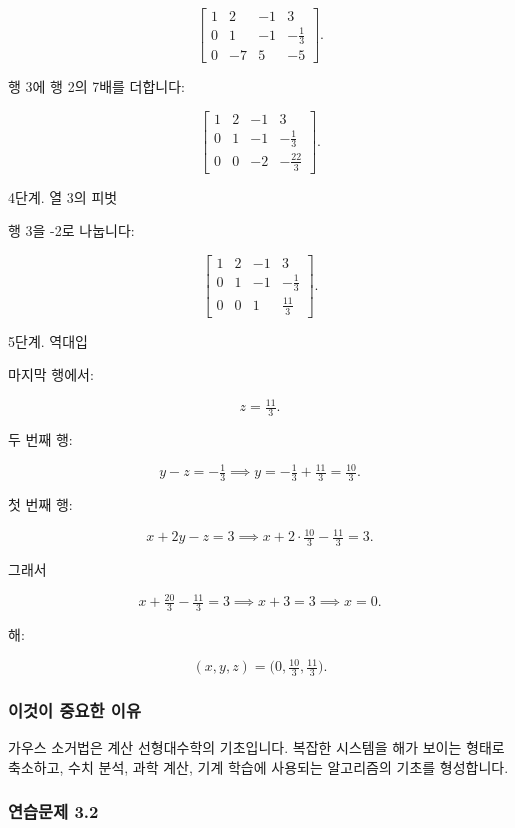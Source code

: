 \documentclass[
  12pt,
  a4paper,
]{article}
\begin{document}
\[\left[\begin{array}{ccc|c}
1 & 2 & -1 & 3 \\
0 & 1 & -1 & -\tfrac{1}{3} \\
0 & -7 & 5 & -5
\end{array}\right].\]

행 3에 행 2의 7배를 더합니다:

\[\left[\begin{array}{ccc|c}
1 & 2 & -1 & 3 \\
0 & 1 & -1 & -\tfrac{1}{3} \\
0 & 0 & -2 & -\tfrac{22}{3}
\end{array}\right].\]

4단계. 열 3의 피벗

행 3을 -2로 나눕니다:

\[\left[\begin{array}{ccc|c}
1 & 2 & -1 & 3 \\
0 & 1 & -1 & -\tfrac{1}{3} \\
0 & 0 & 1 & \tfrac{11}{3}
\end{array}\right].\]

5단계. 역대입

마지막 행에서:

\[z = \tfrac{11}{3}.\]

두 번째 행:

\[y - z = -\tfrac{1}{3} \implies y = -\tfrac{1}{3} + \tfrac{11}{3} = \tfrac{10}{3}.\]

첫 번째 행:

\[x + 2y - z = 3 \implies x + 2\cdot\tfrac{10}{3} - \tfrac{11}{3} = 3.\]

그래서

\[x + \tfrac{20}{3} - \tfrac{11}{3} = 3 \implies x + 3 = 3 \implies x = 0.\]

해:

\[(x,y,z) = \big(0, \tfrac{10}{3}, \tfrac{11}{3}\big).\]

\subsubsection{이것이 중요한 이유}\label{why-this-matters-9}

가우스 소거법은 계산 선형대수학의 기초입니다. 복잡한 시스템을 해가 보이는 형태로 축소하고, 수치 분석, 과학 계산, 기계 학습에 사용되는 알고리즘의 기초를 형성합니다.

\subsubsection{연습문제 3.2}\label{exercises-32}
\end{document}
